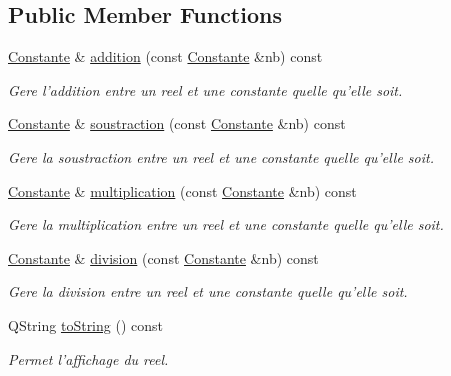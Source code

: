 \subsection*{\-Public \-Member \-Functions}
\begin{DoxyCompactItemize}
\item 
\hyperlink{class_l_o21_1_1_constante}{\-Constante} \& \hyperlink{class_l_o21_1_1_reel_ada705f00ece11942f330bad8497c2cb5}{addition} (const \hyperlink{class_l_o21_1_1_constante}{\-Constante} \&nb) const 
\begin{DoxyCompactList}\small\item\em \-Gere l'addition entre un reel et une constante quelle qu'elle soit. \end{DoxyCompactList}\item 
\hyperlink{class_l_o21_1_1_constante}{\-Constante} \& \hyperlink{class_l_o21_1_1_reel_a9e9ed5805f01d5661aa26c5f626e10ad}{soustraction} (const \hyperlink{class_l_o21_1_1_constante}{\-Constante} \&nb) const 
\begin{DoxyCompactList}\small\item\em \-Gere la soustraction entre un reel et une constante quelle qu'elle soit. \end{DoxyCompactList}\item 
\hyperlink{class_l_o21_1_1_constante}{\-Constante} \& \hyperlink{class_l_o21_1_1_reel_a01e5dc973684a30f98f7bde0d0c5840d}{multiplication} (const \hyperlink{class_l_o21_1_1_constante}{\-Constante} \&nb) const 
\begin{DoxyCompactList}\small\item\em \-Gere la multiplication entre un reel et une constante quelle qu'elle soit. \end{DoxyCompactList}\item 
\hyperlink{class_l_o21_1_1_constante}{\-Constante} \& \hyperlink{class_l_o21_1_1_reel_a2b4c6ae1d997ddd4e32e10e4511cfae0}{division} (const \hyperlink{class_l_o21_1_1_constante}{\-Constante} \&nb) const 
\begin{DoxyCompactList}\small\item\em \-Gere la division entre un reel et une constante quelle qu'elle soit. \end{DoxyCompactList}\item 
\-Q\-String \hyperlink{class_l_o21_1_1_reel_a3a9ad40b48c0fe365d69d023b026b34c}{to\-String} () const 
\begin{DoxyCompactList}\small\item\em \-Permet l'affichage du reel. \end{DoxyCompactList}\item 

\end{DoxyCompactItemize}
